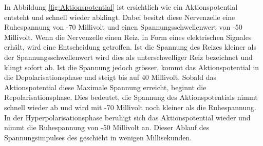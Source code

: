 \begin{refsection}
\noindent
In Abbildung \ref{fig:Aktionspotential} ist ersichtlich wie ein Aktionspotential entsteht und schnell wieder abklingt.
Dabei besitzt diese Nervenzelle eine Ruhespannung von -70 Millivolt und einen Spannungsschwellenwert von -50 Millivolt.
Wenn die Nervenzelle einen Reiz, in Form eines elektrischen Signales erhält, wird eine Entscheidung getroffen. 
Ist die Spannung des Reizes kleiner als der Spannungsschwellenwert wird dies als unterschwelliger Reiz bezeichnet und klingt sofort ab.
Ist die Spannung jedoch grösser, kommt das Aktionspotential in die Depolarisationsphase und steigt bis auf 40 Millivolt.
Sobald das Aktionspotential diese Maximale Spannung erreicht, beginnt die Repolarisationsphase.
Dies bedeutet, die Spannung des Aktionspotentials nimmt schnell wieder ab und wird mit -70 Millivolt noch kleiner als die Ruhespannung.
In der Hyperpolarisationsphase beruhigt sich das Aktionspotential wieder und nimmt die Ruhespannung von -50 Millivolt an.
Dieser Ablauf des Spannungsimpulses des geschieht in wenigen Millisekunden.


\end{refsection}
